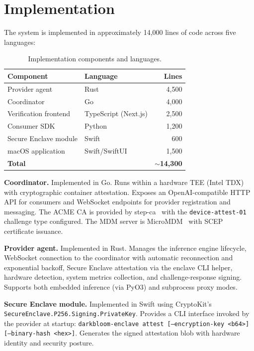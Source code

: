\documentclass[10pt,twocolumn,letterpaper]{article}
\begin{document}
\section{Implementation}
\label{sec:impl}

The system is implemented in approximately 14,000 lines of code across five languages:

\begin{table}[h]
\centering
\caption{Implementation components and languages.}
\vspace{4pt}
\small
\begin{tabular}{@{}llr@{}}
\toprule
\textbf{Component} & \textbf{Language} & \textbf{Lines} \\
\midrule
Provider agent & Rust & 4,500 \\
Coordinator & Go & 4,000 \\
Verification frontend & TypeScript (Next.js) & 2,500 \\
Consumer SDK & Python & 1,200 \\
Secure Enclave module & Swift & 600 \\
macOS application & Swift/SwiftUI & 1,500 \\
\midrule
\textbf{Total} && \textbf{$\sim$14,300} \\
\bottomrule
\end{tabular}
\end{table}

\textbf{Coordinator.} Implemented in Go. Runs within a hardware TEE (Intel TDX) with cryptographic container attestation. Exposes an OpenAI-compatible HTTP API for consumers and WebSocket endpoints for provider registration and messaging. The ACME CA is provided by step-ca~\cite{step-ca} with the \texttt{device-attest-01} challenge type configured. The MDM server is MicroMDM~\cite{micromdm} with SCEP certificate issuance.

\textbf{Provider agent.} Implemented in Rust. Manages the inference engine lifecycle, WebSocket connection to the coordinator with automatic reconnection and exponential backoff, Secure Enclave attestation via the enclave CLI helper, hardware detection, system metrics collection, and challenge-response signing. Supports both embedded inference (via PyO3) and subprocess proxy modes.

\textbf{Secure Enclave module.} Implemented in Swift using CryptoKit's \texttt{SecureEnclave.P256.Signing.PrivateKey}. Provides a CLI interface invoked by the provider at startup: \texttt{darkbloom-enclave attest [--encryption-key <b64>] [--binary-hash <hex>]}. Generates the signed attestation blob with hardware identity and security posture.
\end{document}
